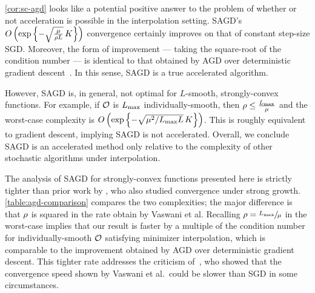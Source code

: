\autoref{cor:sc-agd} looks like a potential positive answer to the problem of whether or not acceleration is possible in the interpolation setting.
\ac{SAGD}'s \( O\rbr{ \exp \cbr{- \sqrt{\frac{\mu}{\sgc L}} \, K}} \) convergence certainly improves on that of constant step-size \ac{SGD}.
Moreover, the form of improvement --- taking the square-root of the condition number --- is identical to that obtained by \ac{AGD} over deterministic gradient descent~\citep{nesterov2004lectures}.
In this sense, \ac{SAGD} is a true accelerated algorithm.

However, \ac{SAGD} is, in general, not optimal for \( L \)-smooth, strongly-convex functions. 
For example, if \( \oracle{} \) is \( \Lmax \) individually-smooth, then \( \sgc \leq \frac{\Lmax}{\mu} \) and the worst-case complexity is \( O\rbr{ \exp \cbr{- \sqrt{\mu^2 / \Lmax L} \, K}}\).
This is roughly equivalent to gradient descent, implying \ac{SAGD} is not accelerated. 
Overall, we conclude \ac{SAGD} is an accelerated method only relative to the complexity of other stochastic algorithms under interpolation.

The analysis of \ac{SAGD} for strongly-convex functions presented here is strictly tighter than prior work by \citet[Theorem 1]{vaswani2019fast}, who also studied convergence under strong growth.
\autoref{table:agd-comparison} compares the two complexities; the major difference is that \( \sgc \) is squared in the rate obtain by Vaswani et al. 
Recalling \( \sgc = \sfrac{\Lmax}{\mu} \) in the worst-case implies that our result is faster by a multiple of the condition number for individually-smooth \( \oracle{} \) satisfying minimizer interpolation, which is comparable to the improvement obtained by \ac{AGD} over deterministic gradient descent.
This tighter rate addresses the criticism of~\citet{liu2020accelerating}, who showed that the convergence speed shown by Vaswani et al.\ could be slower than \ac{SGD} in some circumstances. 


